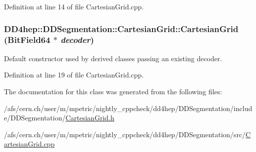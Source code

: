 Definition at line 14 of file CartesianGrid.cpp.\hypertarget{class_d_d4hep_1_1_d_d_segmentation_1_1_cartesian_grid_a5a6b4d64466513cabaaf38060b640be8}{
\subsubsection[{CartesianGrid}]{\setlength{\rightskip}{0pt plus 5cm}DD4hep::DDSegmentation::CartesianGrid::CartesianGrid ({\bf BitField64} $\ast$ {\em decoder})}}
\label{class_d_d4hep_1_1_d_d_segmentation_1_1_cartesian_grid_a5a6b4d64466513cabaaf38060b640be8}


Default constructor used by derived classes passing an existing decoder. 

Definition at line 19 of file CartesianGrid.cpp.

The documentation for this class was generated from the following files:\begin{DoxyCompactItemize}
\item 
/afs/cern.ch/user/m/mpetric/nightly\_\-cppcheck/dd4hep/DDSegmentation/include/DDSegmentation/\hyperlink{_cartesian_grid_8h}{CartesianGrid.h}\item 
/afs/cern.ch/user/m/mpetric/nightly\_\-cppcheck/dd4hep/DDSegmentation/src/\hyperlink{_cartesian_grid_8cpp}{CartesianGrid.cpp}\end{DoxyCompactItemize}
